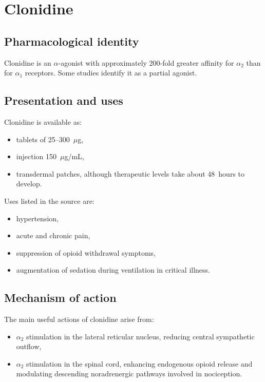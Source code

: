 \documentclass[11pt,a4paper]{article}
\begin{document}
\section{Clonidine}

\subsection{Pharmacological identity}

Clonidine is an $\alpha$-agonist with approximately 200-fold greater affinity for $\alpha_2$ than for $\alpha_1$ receptors. Some studies identify it as a partial agonist.

\subsection{Presentation and uses}

Clonidine is available as:
\begin{itemize}
    \item tablets of 25--300~$\mu$g,
    \item injection 150~$\mu$g/mL,
    \item transdermal patches, although therapeutic levels take about 48~hours to develop.
\end{itemize}

Uses listed in the source are:
\begin{itemize}
    \item hypertension,
    \item acute and chronic pain,
    \item suppression of opioid withdrawal symptoms,
    \item augmentation of sedation during ventilation in critical illness.
\end{itemize}

\subsection{Mechanism of action}

The main useful actions of clonidine arise from:
\begin{itemize}
    \item $\alpha_2$ stimulation in the lateral reticular nucleus, reducing central sympathetic outflow,
    \item $\alpha_2$ stimulation in the spinal cord, enhancing endogenous opioid release and modulating descending noradrenergic pathways involved in nociception.
\end{itemize}
\end{document}
